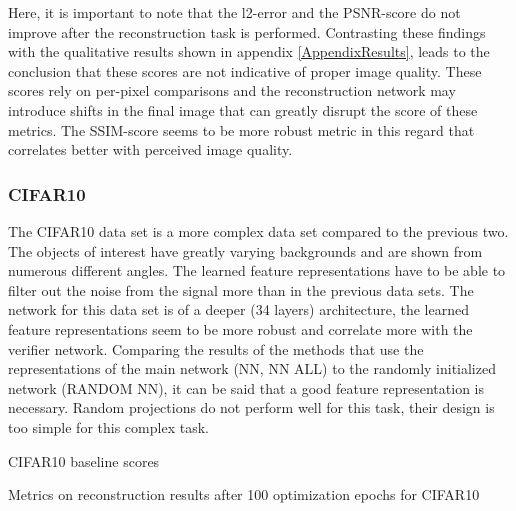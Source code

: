 Here, it is important to note that the l2-error and the PSNR-score do not improve after the reconstruction task is performed.
Contrasting these findings with the qualitative results shown in appendix \ref{AppendixResults}, 
leads to the conclusion that these scores are not indicative of proper image quality.
These scores rely on per-pixel comparisons and the reconstruction network may introduce shifts in the final image
that can greatly disrupt the score of these metrics.
The SSIM-score seems to be more robust metric in this regard that correlates better with perceived image quality.





\subsubsection{CIFAR10}

The CIFAR10 data set is a more complex data set compared to the previous two.
The objects of interest have greatly varying backgrounds and are shown from numerous different angles.
The learned feature representations have to be able to filter out the noise from the signal more than in
the previous data sets.
The network for this data set is of a deeper (34 layers) architecture,
the learned feature representations seem to be more robust and correlate more with the verifier network.
Comparing the results of the methods that use the representations of the main network (NN, NN ALL)
to the randomly initialized network (RANDOM NN), it can be said that a good feature representation is necessary.
Random projections do not perform well for this task, their design is too simple for this complex task.

\begin{table}[!htbp]
\label{tab:cifar10baseline}
\centering
\footnotesize
{}
\caption{CIFAR10 baseline scores}
\end{table}

\begin{table}[!htbp]
\label{tab:cifar10results}
\centering
\footnotesize
{}
\caption{Metrics on reconstruction results after 100 optimization epochs for CIFAR10}
\end{table}






